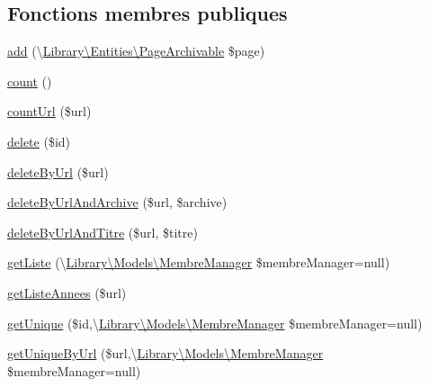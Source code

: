 \subsection*{Fonctions membres publiques}
\begin{DoxyCompactItemize}
\item 
\hyperlink{class_library_1_1_models_1_1_page_archivable_manager_a148f6fc8b26188ff3c990f2deda6e17a}{add} (\textbackslash{}\hyperlink{class_library_1_1_entities_1_1_page_archivable}{Library\textbackslash{}\+Entities\textbackslash{}\+Page\+Archivable} \$page)
\item 
\hyperlink{class_library_1_1_models_1_1_page_archivable_manager_ac751e87b3d4c4bf2feb03bee8b092755}{count} ()
\item 
\hyperlink{class_library_1_1_models_1_1_page_archivable_manager_a4d5b7bba438b0d7e954b84ba2f4e6aca}{count\+Url} (\$url)
\item 
\hyperlink{class_library_1_1_models_1_1_page_archivable_manager_a2f8258add505482d7f00ea26493a5723}{delete} (\$id)
\item 
\hyperlink{class_library_1_1_models_1_1_page_archivable_manager_ae7695b0ed10f2aa20708606d5a4c54dc}{delete\+By\+Url} (\$url)
\item 
\hyperlink{class_library_1_1_models_1_1_page_archivable_manager_a5e7c0bb0071967b0bbaf4ce5e657962a}{delete\+By\+Url\+And\+Archive} (\$url, \$archive)
\item 
\hyperlink{class_library_1_1_models_1_1_page_archivable_manager_a3bf67f20497b82d53f6ed33439c6eff2}{delete\+By\+Url\+And\+Titre} (\$url, \$titre)
\item 
\hyperlink{class_library_1_1_models_1_1_page_archivable_manager_ab569f8e7e64b40e73bb4602d0100949a}{get\+Liste} (\textbackslash{}\hyperlink{class_library_1_1_models_1_1_membre_manager}{Library\textbackslash{}\+Models\textbackslash{}\+Membre\+Manager} \$membre\+Manager=null)
\item 
\hyperlink{class_library_1_1_models_1_1_page_archivable_manager_a90f86d4cb388f5513a9a205921af0024}{get\+Liste\+Annees} (\$url)
\item 
\hyperlink{class_library_1_1_models_1_1_page_archivable_manager_a6813dfac681bc517ce0a9608f48367f3}{get\+Unique} (\$id,\textbackslash{}\hyperlink{class_library_1_1_models_1_1_membre_manager}{Library\textbackslash{}\+Models\textbackslash{}\+Membre\+Manager} \$membre\+Manager=null)
\item 
\hyperlink{class_library_1_1_models_1_1_page_archivable_manager_af0e5053789c8ab10d26dff9390e9e3b1}{get\+Unique\+By\+Url} (\$url,\textbackslash{}\hyperlink{class_library_1_1_models_1_1_membre_manager}{Library\textbackslash{}\+Models\textbackslash{}\+Membre\+Manager} \$membre\+Manager=null)

\end{DoxyCompactItemize}
